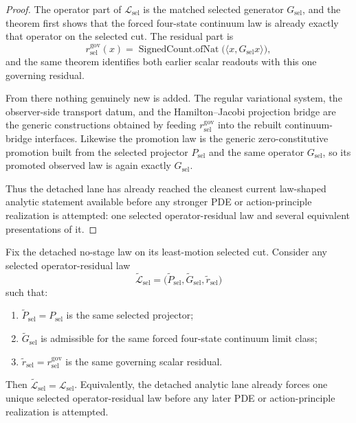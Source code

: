 \begin{proof}
The operator part of \(\mathcal{L}_{\mathrm{sel}}\) is the matched selected
generator \(G_{\mathrm{sel}}\), and the theorem first shows that the forced
four-state continuum law is already exactly that operator on the selected cut.
The residual part is
\[
r^{\mathrm{gov}}_{\mathrm{sel}}(x)=
\operatorname{SignedCount.ofNat}\!\bigl(\langle x,G_{\mathrm{sel}}x\rangle\bigr),
\]
and the same theorem identifies both earlier scalar readouts with this one
governing residual.

From there nothing genuinely new is added. The regular variational system, the
observer-side transport datum, and the Hamilton--Jacobi projection bridge are
the generic constructions obtained by feeding \(r^{\mathrm{gov}}_{\mathrm{sel}}\)
into the rebuilt continuum-bridge interfaces. Likewise the promotion law is the
generic zero-constitutive promotion built from the selected projector
\(P_{\mathrm{sel}}\) and the same operator \(G_{\mathrm{sel}}\), so its
promoted observed law is again exactly \(G_{\mathrm{sel}}\).

Thus the detached lane has already reached the cleanest current law-shaped
analytic statement available before any stronger PDE or action-principle
realization is attempted: one selected operator-residual law and several
equivalent presentations of it.
\end{proof}

\begin{theorem}
\label{thm:the-selected-operator-residual-law-is-uniquely-forced}
Fix the detached no-stage law on its least-motion selected cut. Consider any
selected operator-residual law
\[
\widetilde{\mathcal{L}}_{\mathrm{sel}}=
\bigl(\widetilde P_{\mathrm{sel}},\widetilde G_{\mathrm{sel}},
\widetilde r_{\mathrm{sel}}\bigr)
\]
such that:
\begin{enumerate}
\item \(\widetilde P_{\mathrm{sel}}=P_{\mathrm{sel}}\) is the same selected
      projector;
\item \(\widetilde G_{\mathrm{sel}}\) is admissible for the same forced
      four-state continuum limit class;
\item \(\widetilde r_{\mathrm{sel}}=r^{\mathrm{gov}}_{\mathrm{sel}}\) is the
      same governing scalar residual.
\end{enumerate}
Then \(\widetilde{\mathcal{L}}_{\mathrm{sel}}=\mathcal{L}_{\mathrm{sel}}\).
Equivalently, the detached analytic lane already forces one unique selected
operator-residual law before any later PDE or action-principle realization is
attempted.
\end{theorem}

